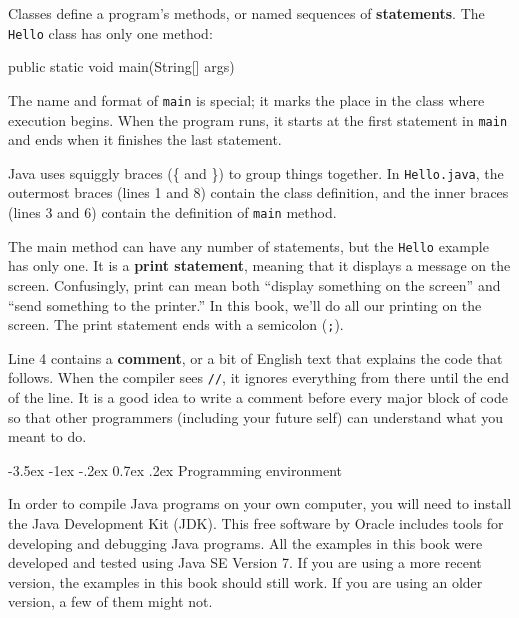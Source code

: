 \documentclass[12pt]{book}
\makeatletter
\theoremstyle{exercise}
\newcommand{\java}[1]{\verb"#1"}
\renewcommand{\section}{\@startsection{section}{1}{\z@}%
    {-3.5ex \@plus -1ex \@minus -.2ex}%
    {0.7ex \@plus.2ex}%
    {\normalfont\Large\bfseries}}
\newcommand{\java}[1]{\lstinline{#1}} %
\makeatother
\begin{document}

Classes define a program's methods, or named sequences of {\bf statements}.
The \java{Hello} class has only one method:

\begin{code}
    public static void main(String[] args)
\end{code}

The name and format of \java{main} is special; it marks the place in the class where execution begins.
When the program runs, it starts at the first statement in \java{main} and ends when it finishes the last statement.


Java uses squiggly braces (\{ and \}) to group things together.
In {\tt Hello.java}, the outermost braces (lines 1 and 8) contain the class definition, and the inner braces (lines 3 and 6) contain the definition of \java{main} method.



The main method can have any number of statements, but the \java{Hello} example has only one.
It is a {\bf print statement}, meaning that it displays a message on the screen.
Confusingly, print can mean both ``display something on the screen'' and ``send something to the printer.''
In this book, we'll do all our printing on the screen.
The print statement ends with a semicolon (\java{;}).


Line 4 contains a {\bf comment}, or a bit of English text that explains the code that follows.
When the compiler sees \java{//}, it ignores everything from there until the end of the line.
It is a good idea to write a comment before every major block of code so that other programmers (including your future self) can understand what you meant to do.


\section{Programming environment}


In order to compile Java programs on your own computer, you will need to install the Java Development Kit (JDK).
This free software by Oracle includes tools for developing and debugging Java programs.
All the examples in this book were developed and tested using Java SE Version 7.
If you are using a more recent version, the examples in this book should still work.
If you are using an older version, a few of them might not.
\end{document}
